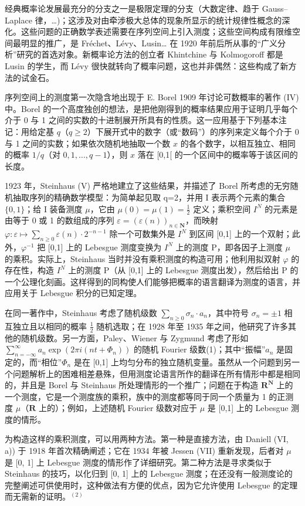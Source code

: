 
经典概率论发展最充分的分支之一是极限定理的分支（大数定律、趋于 Gauss--Laplace 律，\ldots)；这涉及对由牵涉极大总体的现象所显示的统计规律性概念的深化。这些问题的正确数学表述需要在序列空间上引入测度；这些空间构成有限维空间最明显的推广，是 Fréchet、Lévy、Lusin\ldots{} 在 1920 年前后所从事的“广义分析”研究的首选对象。新概率论方法的创立者 Khintchine 与 Kolmogoroff 都是 Lusin 的学生，而 Lévy 很快就转向了概率问题，这也并非偶然：这些构成了新方法的试金石。

序列空间上的测度第一次隐含地出现于 E. Borel 1909 年讨论可数概率的著作 (IV) 中。Borel 的一个高度独创的想法，是把他刚得到的概率结果应用于证明几乎每个介于 0 与 1 之间的实数的十进制展开所具有的性质。这一应用基于下列基本注记：用给定基 \(q\)（\(q \geqslant 2\)）下展开式中的数字（或“数码”）的序列来定义每个介于 0 与 1 之间的实数；如果依次随机地抽取一个数 \(x\) 的各个数字，以相互独立、相同的概率 \(1 / q\)（对 \(0,1,\ldots ,q - 1\)），则 \(x\) 落在 {[}0,1{[} 的一个区间中的概率等于该区间的长度。

1923 年，Steinhaus (V) 严格地建立了这些结果，并描述了 Borel 所考虑的无穷随机抽取序列的精确数学模型：为简单起见取 q=2，并用 I 表示两个元素的集合 \(\{0,1\}\)；给 I 装备测度 \(\mu\)，它由 \(\mu(0)=\mu(1)=\frac{1}{2}\) 定义；乘积空间 \(I^{N}\) 的元素是由等于 0 或 1 的数组成的序列 \(\varepsilon=(\varepsilon(n))_{n\in\mathbf{N}}\)，而映射 \(\varphi:\varepsilon\mapsto\sum_{n\geqslant0}\varepsilon(n)\cdot2^{-n-1}\) 除一个可数集外是 \(I^{N}\) 到区间 {[}0,1{]} 上的一个双射；此外，\(\varphi^{-1}\) 把 {[}0,1{]} 上的 Lebesgue 测度变换为 \(I^{N}\) 上的测度 P，即各因子上测度 \(\mu\) 的乘积。实际上，Steinhaus 当时并没有乘积测度的构造可用；他利用拟双射 \(\varphi\) 的存在性，构造 \(I^{N}\) 上的测度 P（从 {[}0,1{]} 上的 Lebesgue 测度出发），然后给出 P 的一个公理化刻画。这样得到的同构使人们能够把概率的语言翻译为测度的语言，并应用关于 Lebesgue 积分的已知定理。

在同一著作中，Steinhaus 考虑了随机级数 \(\sum_{n\geqslant 0}\sigma_n\cdot a_n\)，其中符号 \(\sigma_{n} = \pm 1\) 相互独立且以相同的概率 \(\frac{1}{2}\) 随机选取；在 1928 年至 1935 年之间，他研究了许多其他的随机级数。另一方面，Paley、Wiener 与 Zygmund 考虑了形如 \(\sum_{n = -\infty}^{\infty}a_n\exp (2\pi i(nt + \Phi_n))\) 的随机 Fourier 级数(1)；其中“振幅”\(a_{n}\) 是固定的，而“相位”\(\Phi_{n}\) 是在 {[}0,1{]} 上均匀分布的独立随机变量。虽然从一个问题到另一个问题解析上的困难相差悬殊，但用测度论语言所作的翻译在所有情形中都是相同的，并且是 Borel 与 Steinhaus 所处理情形的一个推广；问题在于构造 \(\mathbf{R}^{\mathbf{N}}\) 上的一个测度，它是一个测度族的乘积，族中的测度都等同于同一个质量为 1 的正测度 \(\mu\)（\(\mathbf{R}\) 上的）；例如，上述随机 Fourier 级数对应于 \(\mu\) 是 {[}0,1{]} 上的 Lebesgue 测度的情形。

为构造这样的乘积测度，可以用两种方法。第一种是直接方法，由 Daniell (VI, a)) 于 1918 年首次精确阐述；它在 1934 年被 Jessen (VII) 重新发现，后者对 \(\mu\) 是 {[}0, 1{]} 上 Lebesgue 测度的情形作了详细研究。第二种方法是寻求类似于 Steinhaus 的技巧，以化归到 {[}0, 1{]} 上的 Lebesgue 测度；在还没有一般测度论的完整阐述可供使用时，这种做法有方便的优点，因为它允许使用 Lebesgue 的定理而无需新的证明。\(^{(2)}\)

